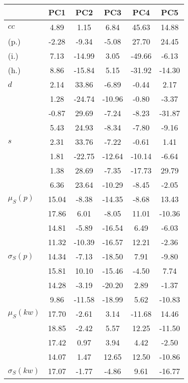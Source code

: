 \begin{table}[h!]
\begin{center}
\begin{tabular}{| l | c | c | c | c | c |}\hline
 & PC1 & PC2 & PC3 & PC4 & PC5 \\\hline
$cc$ & 4.89  & 1.15  & 6.84  & 45.63  & 14.88 \\\hline
(p.) & -2.28  & -9.34  & -5.08  & 27.70  & 24.45 \\\hline
(i.) & 7.13  & -14.99  & 3.05  & -49.66  & -6.13 \\\hline
(h.) & 8.86  & -15.84  & 5.15  & -31.92  & -14.30 \\\hline
$d$ & 2.14  & 33.86  & -6.89  & -0.44  & 2.17 \\\hline
 & 1.28  & -24.74  & -10.96  & -0.80  & -3.37 \\\hline
 & -0.87  & 29.69  & -7.24  & -8.23  & -31.87 \\\hline
 & 5.43  & 24.93  & -8.34  & -7.80  & -9.16 \\\hline
$s$ & 2.31  & 33.76  & -7.22  & -0.61  & 1.41 \\\hline
 & 1.81  & -22.75  & -12.64  & -10.14  & -6.64 \\\hline
 & 1.38  & 28.69  & -7.35  & -17.73  & 29.79 \\\hline
 & 6.36  & 23.64  & -10.29  & -8.45  & -2.05 \\\hline
$\mu_S(p)$ & 15.04  & -8.38  & -14.35  & -8.68  & 13.43 \\\hline
 & 17.86  & 6.01  & -8.05  & 11.01  & -10.36 \\\hline
 & 14.81  & -5.89  & -16.54  & 6.49  & -6.03 \\\hline
 & 11.32  & -10.39  & -16.57  & 12.21  & -2.36 \\\hline
$\sigma_S(p)$ & 14.34  & -7.13  & -18.50  & 7.91  & -9.80 \\\hline
 & 15.81  & 10.10  & -15.46  & -4.50  & 7.74 \\\hline
 & 14.28  & -3.19  & -20.20  & 2.89  & -1.37 \\\hline
 & 9.86  & -11.58  & -18.99  & 5.62  & -10.83 \\\hline
$\mu_S(kw)$ & 17.70  & -2.61  & 3.14  & -11.68  & 14.46 \\\hline
 & 18.85  & -2.42  & 5.57  & 12.25  & -11.50 \\\hline
 & 17.42  & 0.97  & 3.94  & 4.42  & -2.50 \\\hline
 & 14.07  & 1.47  & 12.65  & 12.50  & -10.86 \\\hline
$\sigma_S(kw)$ & 17.07  & -1.77  & -4.86  & 9.61  & -16.77 \\\hline

\end{tabular}
\end{center}
\end{table}
